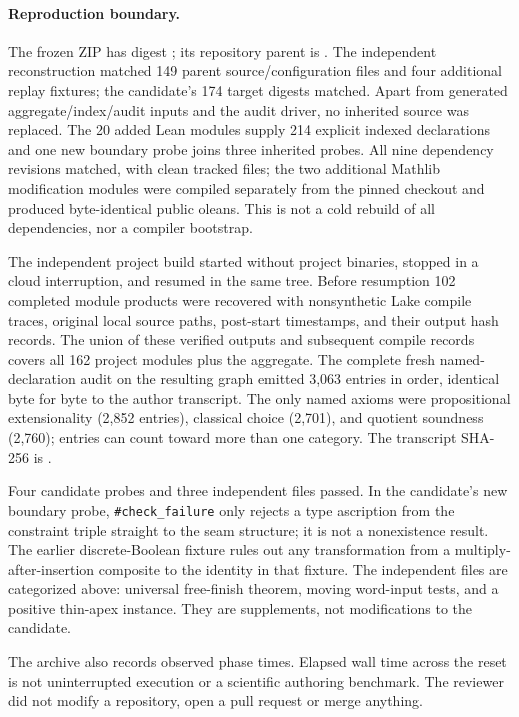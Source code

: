 \documentclass[11pt]{article}
\begin{document}
\paragraph{Reproduction boundary.}
The frozen ZIP has digest ;
its repository parent is .
The independent reconstruction matched 149 parent source/configuration files
and four additional replay fixtures; the candidate's 174 target digests matched.
Apart from generated aggregate/index/audit inputs and the audit driver, no
inherited source was replaced. The 20 added Lean modules supply 214 explicit
indexed declarations and one new boundary probe joins three inherited probes.
All nine dependency revisions matched, with clean tracked files; the two
additional Mathlib modification modules were compiled separately from the
pinned checkout and produced byte-identical public oleans. This is not a
cold rebuild of all dependencies, nor a compiler bootstrap.
\par The independent project build started without project binaries,
stopped in a cloud interruption, and resumed in the same tree. Before
resumption 102 completed module products were recovered with nonsynthetic
Lake compile traces, original local source paths, post-start timestamps,
and their output hash records. The union of these verified outputs and
subsequent compile records covers all 162 project modules plus the aggregate.
The complete fresh named-declaration audit on the resulting graph emitted
3,063 entries in order, identical byte for byte to the author transcript.
The only named axioms were propositional extensionality (2,852 entries),
classical choice (2,701), and quotient soundness (2,760); entries can count
toward more than one category. The transcript SHA-256 is
.
\par Four candidate probes and three independent files passed. In the
candidate's new boundary probe, \texttt{\#check\_failure} only rejects a
type ascription from the constraint triple straight to the seam structure;
it is not a nonexistence result. The earlier discrete-Boolean fixture rules
out any transformation from a multiply-after-insertion composite to the
identity in that fixture. The independent files are categorized above:
universal free-finish theorem, moving word-input tests, and a positive
thin-apex instance. They are supplements, not modifications to the candidate.
\par The archive also records observed phase times. Elapsed wall time across
the reset is not uninterrupted execution or a scientific authoring benchmark.
The reviewer did not modify a repository, open a pull request or merge anything.
\end{document}
